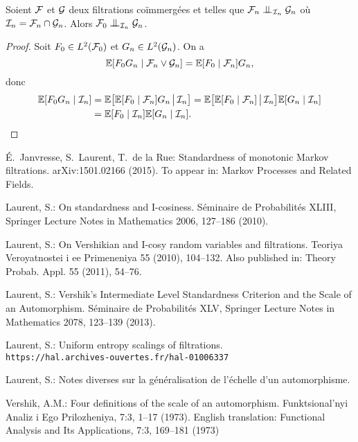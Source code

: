 \documentclass[12pt,a4paper]{article}
\begin{document}
\begin{appendices}
\begin{lemme}
Soient $\mathcal{F}$ et $\mathcal{G}$ deux filtrations co\"immergées et telles que 
$\FF_{n} \indep_{\II_{n}} \GG_{n}$ où $\mathcal{I}_{n} = \mathcal{F}_{n} \cap \mathcal{G}_{n}$. 
Alors  $\FF_{0} \indep_{\II_{n}} \GG_{n}$.  
\end{lemme}

\begin{proof}
Soit $F_0 \in L^2(\mathcal{F}_0)$ et $G_n \in L^2(\mathcal{G}_n)$. On a 
$$
\mathbb{E}[F_0G_n \mid \mathcal{F}_n \vee \mathcal{G}_n] = \mathbb{E}[F_0 \mid \mathcal{F}_n] G_n,
$$
donc 
\begin{align*}
\mathbb{E}[F_0G_n \mid \mathcal{I}_n] & = 
\mathbb{E}\bigl[\mathbb{E}[F_0 \mid \mathcal{F}_n] G_n \,\big\vert\, \mathcal{I}_n \bigr] 
= \mathbb{E}\bigl[\mathbb{E}[F_0 \mid \mathcal{F}_n] \,\big\vert\, \mathcal{I}_n \bigr] \mathbb{E}[G_n \mid \mathcal{I}_n ] \\
& = \mathbb{E}[F_0 \mid \mathcal{I}_n]  \mathbb{E}[G_n \mid \mathcal{I}_n ].
\end{align*}
\end{proof}

\end{appendices}

\begin{thebibliography}{99.}

\'E.~Janvresse, S.~Laurent, T.~de la Rue: 
Standardness of monotonic Markov filtrations. 
	arXiv:1501.02166 (2015). 
To appear in: Markov Processes and Related Fields. 

 Laurent, S.: 
On standardness and I-cosiness. S\'eminaire de Probabilit\'es XLIII, 
Springer Lecture Notes in Mathematics 2006, 
127--186 (2010).

 Laurent, S.: 
On Vershikian and I-cosy random variables and filtrations.
Teoriya Veroyatnostei i ee Primeneniya 55 (2010), 104--132. 
Also published in: Theory Probab. Appl. 55 (2011), 54--76.

Laurent, S.: 
Vershik's Intermediate Level Standardness Criterion and the Scale of an Automorphism. 
S\'eminaire de Probabilit\'es XLV,
Springer Lecture Notes in Mathematics 2078,
123--139 (2013).

Laurent, S.: 
Uniform entropy scalings of filtrations. \\
\verb+https://hal.archives-ouvertes.fr/hal-01006337+ 

Laurent, S.: 
Notes diverses sur la généralisation de l'échelle d'un automorphisme. 

Vershik, A.M.: 
Four definitions of the scale of an automorphism. 
Funktsional'nyi Analiz i Ego Prilozheniya, 7:3, 
1--17 (1973). 
English translation:    
Functional Analysis and Its Applications, 7:3, 169--181 (1973)


\end{thebibliography}
\end{document}

